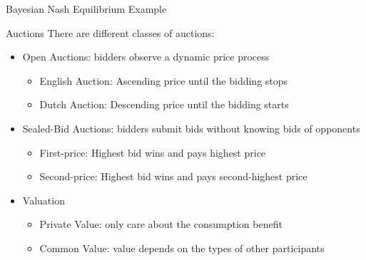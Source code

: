 \documentclass[10pt]{extarticle}
\begin{document}
  \begin{problem}{Bayesian Nash Equilibrium Example}
    \begin{tcbraster}[raster columns = 1, sharp corners, colframe = black!75!white,colback=white]
    \end{tcbraster}
  \end{problem}
  \begin{problem}{Auctions}
    There are different classes of auctions:
    \begin{itemize}
      \item Open Auctions: bidders observe a dynamic price process
        \begin{itemize}
          \item English Auction: Ascending price until the bidding stops
          \item Dutch Auction: Descending price until the bidding starts
        \end{itemize}
      \item Sealed-Bid Auctions: bidders submit bids without knowing bids of opponents
        \begin{itemize}
          \item First-price: Highest bid wins and pays highest price
          \item Second-price: Highest bid wins and pays second-highest price
        \end{itemize}
      \item Valuation
        \begin{itemize}
          \item Private Value: only care about the consumption benefit
          \item Common Value: value depends on the types of other participants
        \end{itemize}
    \end{itemize}
  \end{problem}
\end{document}
